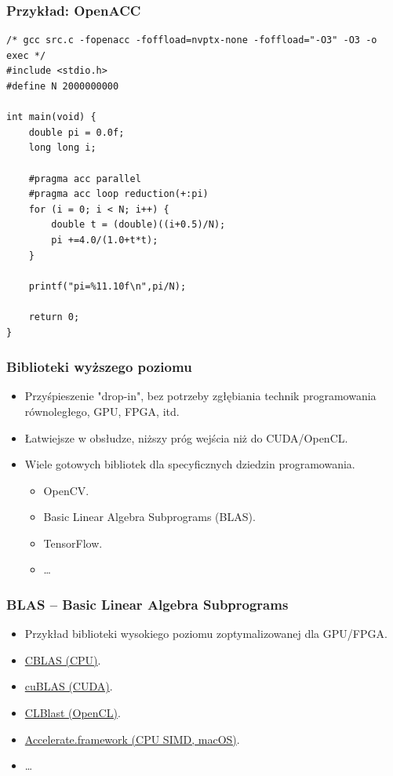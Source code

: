 \documentclass[dvipsnames,table]{beamer}
\begin{document}
\begin{frame}[fragile]
	\frametitle{Przykład: OpenACC}
\begin{lstlisting}
/* gcc src.c -fopenacc -foffload=nvptx-none -foffload="-O3" -O3 -o exec */
#include <stdio.h>
#define N 2000000000

int main(void) {
	double pi = 0.0f;
	long long i;

	#pragma acc parallel
	#pragma acc loop reduction(+:pi)
	for (i = 0; i < N; i++) {
		double t = (double)((i+0.5)/N);
		pi +=4.0/(1.0+t*t);
	}

	printf("pi=%11.10f\n",pi/N);

	return 0;
}
\end{lstlisting}
\end{frame}

\begin{frame}
	\frametitle{Biblioteki wyższego poziomu}
\begin{itemize}
	\item Przyśpieszenie "drop-in", bez potrzeby zgłębiania technik programowania równoległego, GPU, FPGA, itd.
	\item Łatwiejsze w obsłudze, niższy próg wejścia niż do CUDA/OpenCL.
	\item Wiele gotowych bibliotek dla specyficznych dziedzin programowania.
	\begin{itemize}
		\item OpenCV.
		\item Basic Linear Algebra Subprograms (BLAS).
		\item TensorFlow.
		\item \ldots 
	\end{itemize}
\end{itemize}
\end{frame}

\begin{frame}
	\frametitle{BLAS -- Basic Linear Algebra Subprograms} 
\begin{itemize}
	\item Przykład biblioteki wysokiego poziomu zoptymalizowanej dla GPU/FPGA.
	\item \href{http://www.netlib.org/blas/}{CBLAS (CPU)}.
	\item \href{https://docs.nvidia.com/cuda/cublas/index.html}{cuBLAS (CUDA)}.
	\item \href{https://github.com/CNugteren/CLBlast}{CLBlast (OpenCL)}.
	\item \href{https://developer.apple.com/documentation/accelerate/blas}{Accelerate.framework (CPU SIMD, macOS)}.
	\item \ldots
\end{itemize}
\end{frame}
\end{document}
